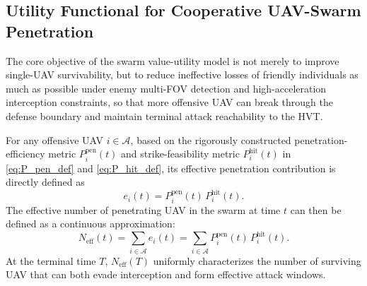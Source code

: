 \documentclass{cja}
\begin{document}
\subsection{Utility Functional for Cooperative UAV-Swarm Penetration}

The core objective of the swarm value-utility model is not merely to improve single-UAV survivability, but to reduce ineffective losses of friendly individuals as much as possible under enemy multi-FOV detection and high-acceleration interception constraints, so that more offensive UAV can break through the defense boundary and maintain terminal attack reachability to the HVT.

For any offensive UAV $i\in\mathcal{A}$, based on the rigorously constructed penetration-efficiency metric $P_i^{\mathrm{pen}}(t)$ and strike-feasibility metric $P_i^{\mathrm{hit}}(t)$ in \eqref{eq:P_pen_def} and \eqref{eq:P_hit_def}, its effective penetration contribution is directly defined as
\begin{equation}
e_i(t)
=
P_i^{\mathrm{pen}}(t)\,P_i^{\mathrm{hit}}(t).
\end{equation}
The effective number of penetrating UAV in the swarm at time $t$ can then be defined as a continuous approximation:
\begin{equation}
N_{\mathrm{eff}}(t)
=
\sum_{i\in\mathcal{A}} e_i(t)
=
\sum_{i\in\mathcal{A}} P_i^{\mathrm{pen}}(t)\,P_i^{\mathrm{hit}}(t).
\end{equation}
At the terminal time $T$, $N_{\mathrm{eff}}(T)$ uniformly characterizes the number of surviving UAV that can both evade interception and form effective attack windows.
\end{document}
